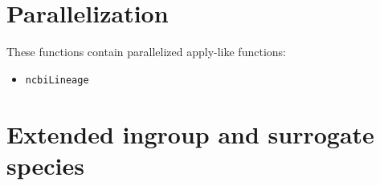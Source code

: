 \documentclass[12pt]{article}
\begin{document}
\section{Parallelization}

These functions contain parallelized apply-like functions:

\begin{itemize}
    \item \texttt{ncbiLineage}
\end{itemize}

\section{Extended ingroup and surrogate species}







\end{document}
